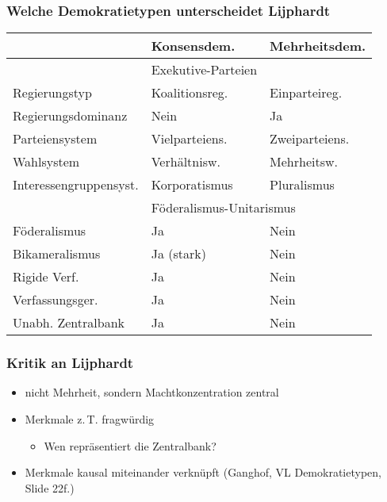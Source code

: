 \documentclass{beamer}
\begin{document}
\begin{frame}
\frametitle{Welche Demokratietypen unterscheidet Lijphardt}
\begin{tabular}{lll}
~   & \textbf{Konsensdem.} & \textbf{Mehrheitsdem.} \\ \hline
~   & Exekutive-Parteien \\ \hline
Regierungstyp  & Koalitionsreg. & Einparteireg. \\
Regierungsdominanz  & Nein & Ja \\
Parteiensystem  & Vielparteiens. & Zweiparteiens. \\
Wahlsystem & Verhältnisw. & Mehrheitsw. \\
Interessengruppensyst.  & Korporatismus & Pluralismus \\ \hline
    & \multicolumn{2}{l}{Föderalismus-Unitarismus} \\ \hline
Föderalismus & Ja & Nein \\
Bikameralismus  & Ja (stark) & Nein \\
Rigide Verf.  & Ja & Nein \\
Verfassungsger.  & Ja & Nein \\
Unabh. Zentralbank & Ja & Nein \\
\end{tabular}
\end{frame}

\begin{frame}
\frametitle{Kritik an Lijphardt}
\begin{itemize}
  \item nicht Mehrheit, sondern Machtkonzentration zentral
  \item Merkmale z.\,T. fragwürdig
  \begin{itemize}
    \item Wen repräsentiert die Zentralbank?
  \end{itemize}
  \item Merkmale kausal miteinander verknüpft\newline
    (Ganghof, VL Demokratietypen, Slide 22f.)
\end{itemize}
\begin{figure}
\centering
{}
\vfill
\begin{figure}
\centering
{}
\end{figure}
\end{figure}
\end{frame}
\end{document}
